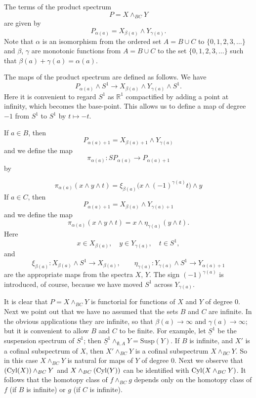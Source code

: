 \documentclass[../main]{subfiles}
\begin{document}
The terms of the product spectrum
\[
    P = X \wedge_{BC} Y
\]
are given by
\[
    P_{\alpha(a)} = X_{\beta(a)} \wedge Y_{\gamma(a)}.
\]
Note that $\alpha$ is an isomorphism from the ordered set $A = B \cup C$ to $\{0, 1, 2, 3, \ldots\}$ and $\beta$, $\gamma$ are monotonic functions from $A = B \cup C$ to the set $\{0, 1, 2, 3, \ldots\}$ such that $\beta(a) + \gamma(a) = \alpha(a)$.

The maps of the product spectrum are defined as follows.
We have
\[
    P_{\alpha(a)} \wedge S^{1} \longrightarrow X_{\beta(a)} \wedge Y_{\gamma(a)} \wedge S^{1}.
\]
Here it is convenient to regard $S^{1}$ as $\mathbb{R}^{1}$ compactified by adding a point at infinity, which becomes the base-point.
This allows us to define a map of degree $-1$ from $S^{1}$ to $S^{1}$ by $t \mapsto -t$.

If $a \in B$, then
\[
    P_{\alpha(a) + 1} = X_{\beta(a) + 1} \wedge Y_{\gamma(a)}
\]
and we define the map
\[
    \pi_{\alpha(a)} \colon SP_{\alpha(a)} \longrightarrow P_{\alpha(a) + 1}
\]
by 

\[
    \pi_{\alpha(a)}(x \wedge y \wedge t) = \xi_{\beta(a)} \big(x \wedge (-1)^{\gamma(a)}t\big) \wedge y
\]
If $a\in C$, then
\[
    P_{\alpha(a)+1}=X_{\beta(a)}\wedge Y_{\gamma(a)+1}
\]
and we define the map
\[
    \pi_{\alpha(a)}(x \wedge y \wedge t) = x \wedge \eta_{\gamma(a)} (y \wedge t).
\]
Here
\[
    x \in X_{\beta(a)}, \quad y \in Y_{\gamma(a)}, \quad t \in S^{1},
\]
and
\[
    \xi_{\beta(a)} \colon X_{\beta(a)} \wedge S^{1} \longrightarrow X_{\beta(a)}, \qquad \eta_{\gamma(a)} \colon Y_{\gamma(a)} \wedge S^{1} \longrightarrow Y_{\alpha(a) + 1}
\]
are the appropriate maps from the spectra $X$, $Y$.
The sign $(-1)^{\gamma(a)}$ is introduced, of course, because we have moved $S^{1}$ across $Y_{\gamma(a)}$.

It is clear that $P = X \wedge_{BC} Y$ is functorial for functions of $X$ and $Y$ of degree 0.
Next we point out that we have no assumed that the sets $B$ and $C$ are infinite.
In the obvious applications they are infinite, so that $\beta(a) \longrightarrow \infty$ and $\gamma(a) \longrightarrow \infty$;
but it is convenient to allow $B$ and $C$ to be finite.
For example, let $\underline{S}^{1}$ be the suspension spectrum of $S^{1}$;
then $\underline{S}^{1} \wedge_{\emptyset, A} Y = \mathrm{Susp}(Y)$.
If $B$ is infinite, and $X'$ is a cofinal subspectrum of $X$, then $X' \wedge_{BC} Y$ is a cofinal subspectrum $X \wedge_{BC} Y$.
So in this case $X \wedge_{BC} Y$ is natural for maps of $Y$ of degree 0.
Next we observe that $(\mathrm{Cyl}(X)) \wedge_{BC} Y$ and $X \wedge_{BC} (\mathrm{Cyl}(Y))$ can be identified with $\mathrm{Cyl}(X \wedge_{BC} Y)$.
It follows that the homotopy class of $f \wedge_{BC} g$ depends only on the homotopy class of $f$ (if $B$ is infinite) or $g$ (if $C$ is infinite).
\end{document}
